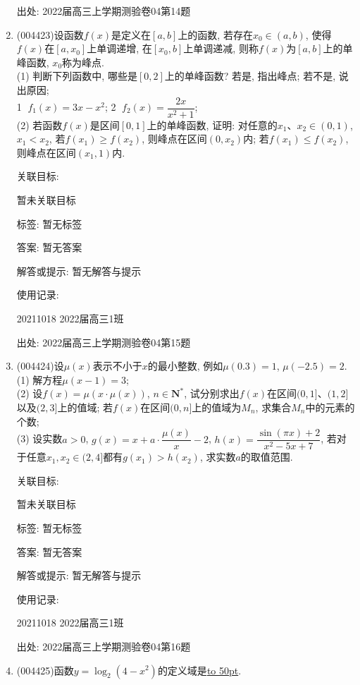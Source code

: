 \documentclass[10pt,a4paper]{article}
\newcommand{\blank}[1]{\underline{\hbox to #1pt{}}}
\begin{document}
\begin{enumerate}[1.]
出处: 2022届高三上学期测验卷04第14题
\item { (004423)}设函数$f(x)$是定义在$[a,b]$上的函数, 若存在$x_0\in (a,b)$, 使得$f(x)$在$[a,x_0]$上单调递增, 在$[x_0,b]$上单调递减, 则称$f(x)$为$[a,b]$上的单峰函数, $x_0$称为峰点.\\
(1) 判断下列函数中, 哪些是$[0,2]$上的单峰函数? 若是, 指出峰点; 若不是, 说出原因;\\
\textcircled{1}  $f_1(x)=3x-x^2$; \textcircled{2}  $f_2(x)=\dfrac{2x}{{x^2}+1}$;\\
(2) 若函数$f(x)$是区间$[0,1]$上的单峰函数, 证明: 对任意的$x_1$、$x_2\in (0,1)$, $x_1<x_2$, 若$f(x_1)\ge f(x_2)$, 则峰点在区间$(0,x_2)$内; 若$f(x_1)\le f(x_2)$, 则峰点在区间$(x_1,1)$内.


关联目标:

暂未关联目标



标签: 暂无标签

答案: 暂无答案

解答或提示: 暂无解答与提示

使用记录:

20211018	2022届高三1班		


出处: 2022届高三上学期测验卷04第15题
\item { (004424)}设$\mu (x)$表示不小于$x$的最小整数, 例如$\mu(0.3)=1$, $\mu(-2.5)=2$.\\
(1) 解方程$\mu(x-1)=3$;\\
(2) 设$f(x)=\mu (x\cdot \mu (x))$, $n\in \mathbf{N}^*$, 试分别求出$f(x)$在区间$(0,1]$、$(1,2]$以及$(2,3]$上的值域; 若$f(x)$在区间$(0,n]$上的值域为$M_n$, 求集合$M_n$中的元素的个数;\\
(3) 设实数$a>0$, $g(x)=x+a\cdot \dfrac{\mu (x)}x-2$, $h(x)=\dfrac{\sin (\pi x)+2}{x^2-5x+7}$, 若对于任意$x_1,x_2\in (2,4]$都有$g(x_1)>h(x_2)$, 求实数$a$的取值范围.


关联目标:

暂未关联目标



标签: 暂无标签

答案: 暂无答案

解答或提示: 暂无解答与提示

使用记录:

20211018	2022届高三1班			


出处: 2022届高三上学期测验卷04第16题
\item { (004425)}函数$y=\log_2(4-x^2)$的定义域是\blank{50}.



\end{enumerate}
\end{document}
